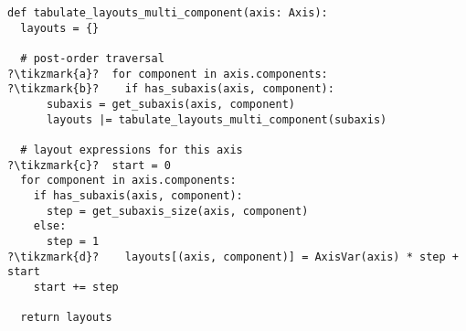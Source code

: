 \documentclass[thesis]{subfiles}
\begin{document}
\begin{algorithm}
  \begin{verbatim}
def tabulate_layouts_multi_component(axis: Axis):
  layouts = {}

  # post-order traversal
?\tikzmark{a}?  for component in axis.components:
?\tikzmark{b}?    if has_subaxis(axis, component): 
      subaxis = get_subaxis(axis, component)
      layouts |= tabulate_layouts_multi_component(subaxis)

  # layout expressions for this axis
?\tikzmark{c}?  start = 0
  for component in axis.components:
    if has_subaxis(axis, component):
      step = get_subaxis_size(axis, component)
    else:
      step = 1
?\tikzmark{d}?    layouts[(axis, component)] = AxisVar(axis) * step + start
    start += step

  return layouts
  \end{verbatim}

\end{algorithm}
\end{document}
